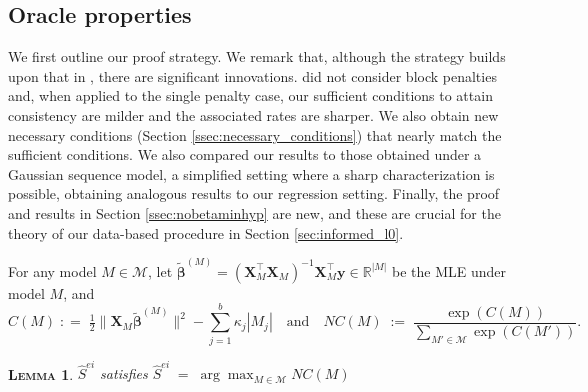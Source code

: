 \documentclass[
  12pt]{article}
\newcommand{\R}{\mathbb{R}}
\newcommand{\M}{\mathcal{M}}
\newcommand{\by}{\mathbf{y}}
\newcommand{\bbeta}{\boldsymbol{\beta}}
\newcommand{\bX}{\mathbf{X}}
\newtheorem{lem}[thm]{\textsc{Lemma}}
\begin{document}
\subsection{Oracle properties}\label{ssec:oracleprop}

We first outline our proof strategy. 
We remark that, although the strategy builds upon that in \cite{rossell2022concentration}, there are significant innovations. \cite{rossell2022concentration} did not consider block penalties and, when applied to the single penalty case, our sufficient conditions to attain consistency are milder and the associated rates are sharper. We also obtain new necessary conditions (Section \ref{ssec:necessary_conditions}) that nearly match the sufficient conditions. 
We also compared our results to those obtained under a Gaussian sequence model, a simplified setting where a sharp characterization is possible, obtaining analogous results to our regression setting. Finally, the proof and results in Section \ref{ssec:nobetaminhyp} are new, and these are crucial for the theory of our data-based procedure in Section \ref{sec:informed_l0}.

For any model $M\in \M$, let $\tilde{\bbeta}^{(M)}= (\bX_{\!\!M}^\top \bX_{\!\!M})^{-1}\bX_{\!\!M}^\top\by \in \R^{|M|}$ be the MLE under model $M$, and 
\begin{equation}\label{eq:CM}
    C(M)\;: =\;\tfrac{1}{2}\|\bX_M\tilde{\bbeta}^{(M)}\|^2-\sum_{j=1}^b\kappa_j |M_j|\quad\text{and}\quad NC(M)\;:=\;\frac{\exp(C(M))}{\underset{M' \in \M}{\sum} \exp(C(M'))}.
\end{equation}
\begin{lem}\label{lem:usefulreformulation} 
$\hat{S}^{ei}$ satisfies $\hat{S}^{ei}\;=\;\arg\max_{M\in \M} NC(M)$ 
\end{lem}
\end{document}
